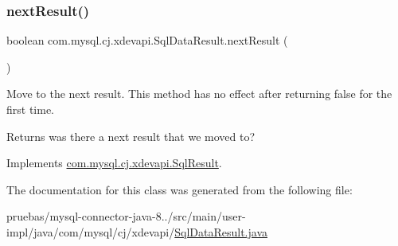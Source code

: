\mbox{\label{classcom_1_1mysql_1_1cj_1_1xdevapi_1_1_sql_data_result_a4dc2d012228a58a9ebe74f93f9a007a9}} 
\subsubsection{\texorpdfstring{next\+Result()}{nextResult()}}
{\footnotesize\ttfamily boolean com.\+mysql.\+cj.\+xdevapi.\+Sql\+Data\+Result.\+next\+Result (\begin{DoxyParamCaption}{ }\end{DoxyParamCaption})}

Move to the next result. This method has no effect after returning {\ttfamily false} for the first time.

\begin{DoxyReturn}{Returns}
was there a next result that we moved to? 
\end{DoxyReturn}


Implements \mbox{\hyperlink{interfacecom_1_1mysql_1_1cj_1_1xdevapi_1_1_sql_result_ad5c821bd2efe2e952aef48dc574e913d}{com.\+mysql.\+cj.\+xdevapi.\+Sql\+Result}}.



The documentation for this class was generated from the following file\+:\begin{DoxyCompactItemize}
\item 
pruebas/mysql-\/connector-\/java-\/8../src/main/user-\/impl/java/com/mysql/cj/xdevapi/\mbox{\hyperlink{_sql_data_result_8java}{Sql\+Data\+Result.\+java}}\end{DoxyCompactItemize}
